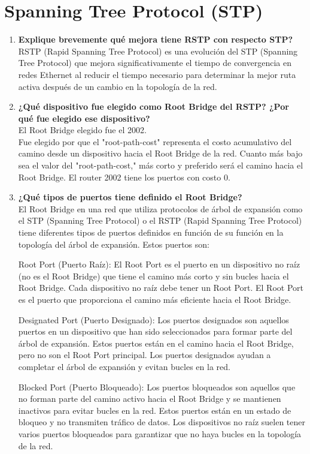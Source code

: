 \documentclass[a4paper]{article}
\begin{document}
\section*{Spanning Tree Protocol (STP)}
\begin{enumerate}
	\item \textbf{Explique brevemente qué mejora tiene RSTP con respecto
	STP?}
	\\
	RSTP (Rapid Spanning Tree Protocol) es una evolución del STP (Spanning Tree Protocol) que mejora significativamente el tiempo de convergencia en redes Ethernet al reducir el tiempo necesario para determinar la mejor ruta activa después de un cambio en la topología de la red.
	\item \textbf{¿Qué dispositivo fue elegido como Root Bridge del RSTP?
	¿Por qué fue elegido ese dispositivo?}
	\\
	El Root Bridge elegido fue el 2002. 
	\\
	Fue elegido por que el "root-path-cost" representa el costo acumulativo del camino desde un dispositivo hacia el Root Bridge de la red. Cuanto más bajo sea el valor del "root-path-cost," más corto y preferido será el camino hacia el Root Bridge. El router 2002 tiene los puertos con costo 0.
	
	\item \textbf{¿Qué tipos de puertos tiene definido el Root Bridge?}
	\\
	El Root Bridge en una red que utiliza protocolos de árbol de expansión como el STP (Spanning Tree Protocol) o el RSTP (Rapid Spanning Tree Protocol) tiene diferentes tipos de puertos definidos en función de su función en la topología del árbol de expansión. Estos puertos son:
	
	Root Port (Puerto Raíz): El Root Port es el puerto en un dispositivo no raíz (no es el Root Bridge) que tiene el camino más corto y sin bucles hacia el Root Bridge. Cada dispositivo no raíz debe tener un Root Port. El Root Port es el puerto que proporciona el camino más eficiente hacia el Root Bridge.
	
	Designated Port (Puerto Designado): Los puertos designados son aquellos puertos en un dispositivo que han sido seleccionados para formar parte del árbol de expansión. Estos puertos están en el camino hacia el Root Bridge, pero no son el Root Port principal. Los puertos designados ayudan a completar el árbol de expansión y evitan bucles en la red.
	
	Blocked Port (Puerto Bloqueado): Los puertos bloqueados son aquellos que no forman parte del camino activo hacia el Root Bridge y se mantienen inactivos para evitar bucles en la red. Estos puertos están en un estado de bloqueo y no transmiten tráfico de datos. Los dispositivos no raíz suelen tener varios puertos bloqueados para garantizar que no haya bucles en la topología de la red.
	

\end{enumerate}
\end{document}
